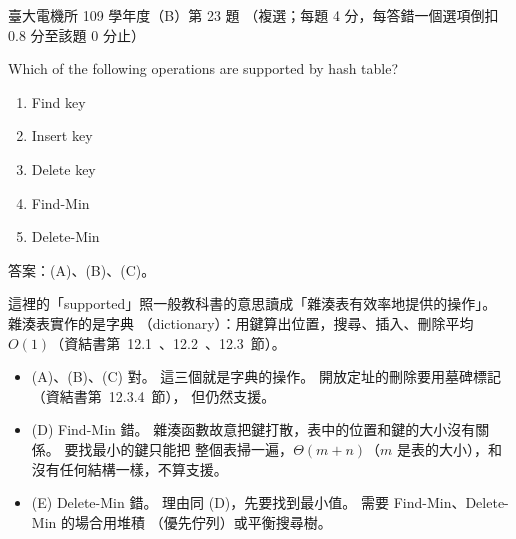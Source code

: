 \begin{pastexam}[label={px:ntu-109-ee-ds-23}]{臺大電機所 109 學年度（B）第 23 題}
（複選；每題 4 分，每答錯一個選項倒扣 0.8 分至該題 0 分止）

Which of the following operations are supported by hash table?
\begin{enumerate}[label=(\Alph*)]
\item Find key
\item Insert key
\item Delete key
\item Find-Min
\item Delete-Min
\end{enumerate}
\end{pastexam}

\begin{pastsoln}
答案：(A)、(B)、(C)。

這裡的「supported」照一般教科書的意思讀成「雜湊表有效率地提供的操作」。 雜湊表實作的是字典
（dictionary）：用鍵算出位置，搜尋、插入、刪除平均 $O(1)$（資結書第~12.1~、12.2~、12.3~節）。
\begin{itemize}
\item (A)、(B)、(C) 對。 這三個就是字典的操作。 開放定址的刪除要用墓碑標記（資結書第~12.3.4~節），
但仍然支援。
\item (D) Find-Min 錯。 雜湊函數故意把鍵打散，表中的位置和鍵的大小沒有關係。 要找最小的鍵只能把
整個表掃一遍，$\Theta(m + n)$（$m$ 是表的大小），和沒有任何結構一樣，不算支援。
\item (E) Delete-Min 錯。 理由同 (D)，先要找到最小值。 需要 Find-Min、Delete-Min 的場合用堆積
（優先佇列）或平衡搜尋樹。
\end{itemize}
\end{pastsoln}
